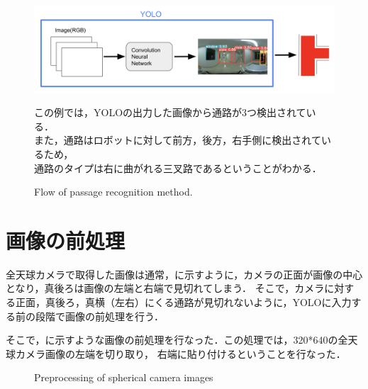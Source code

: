 \documentclass[../main]{subfiles}
\newcommand*\circled[1]{\tikz[baseline=(char.base)]{
            \node[shape=circle,draw,inner sep=1pt] (char) {#1};}}
\begin{document}
        \begin{figure}[H]
            \centering
            \includegraphics[width=15cm]{../images/proposed_method2.png}
            \caption{Flow of passage recognition method.}
            \label{figure::proposed_method_fig}
            この例では，YOLOの出力した画像から通路が3つ検出されている．\\
            また，通路はロボットに対して前方，後方，右手側に検出されているため，\\
            通路のタイプは\circled{6}右に曲がれる三叉路であるということがわかる．
        \end{figure}

        \newpage

        \section{画像の前処理}
        全天球カメラで取得した画像は通常，に示すように，カメラの正面が画像の中心となり，真後ろは画像の左端と右端で見切れてしまう．
        そこで，カメラに対する正面，真後ろ，真横（左右）にくる通路が見切れないように，YOLOに入力する前の段階で画像の前処理を行う．
        
        そこで，に示すような画像の前処理を行なった．この処理では，320*640の全天球カメラ画像の左端を切り取り，
        右端に貼り付けるということを行なった．
        
        \begin{figure}[htbp]
          \centering
           \caption{Preprocessing of spherical camera images}
           \label{figure::proc_exp}
        \end{figure}
        
\end{document}
